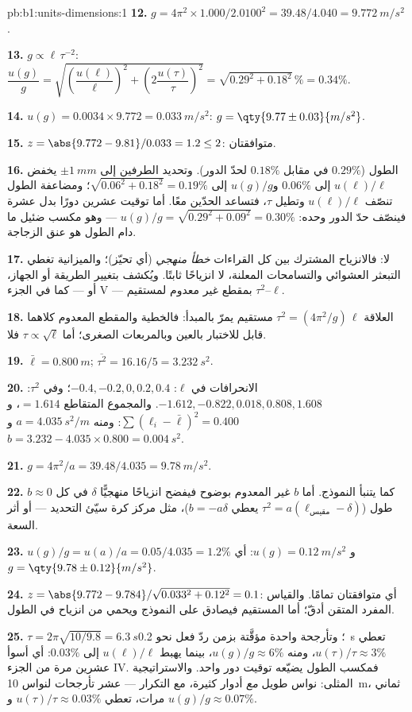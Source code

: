 \begin{solution}{pb:b1:units-dimensions:1}
\textbf{12.} $g = 4\pi^2 \times 1.000/2.0100^2 = 39.48/4.040 =
\qty{9.772}{m/s^2}$.

\textbf{13.} $g \propto \ell\,\tau^{-2}$:
$\dfrac{u(g)}{g} = \sqrt{\left(\dfrac{u(\ell)}{\ell}\right)^2
+ \left(2\dfrac{u(\tau)}{\tau}\right)^2} = \sqrt{0.29^2 + 0.18^2}\,\%
= 0.34\%$.

\textbf{14.} $u(g) = 0.0034 \times 9.772 = \qty{0.033}{m/s^2}$:
$g = \qty{9.77\pm0.03}{m/s^2}$.

\textbf{15.} $z = \abs{9.772 - 9.81}/0.033 = 1.2 \leq 2$: متوافقتان.

\textbf{16.} الطول ($0.29\%$ في مقابل $0.18\%$ لحدّ الدور).
وتحديد الطرفين إلى $\pm\qty{1}{mm}$ يخفض $u(\ell)/\ell$ إلى
$0.06\%$ و$u(g)/g$ إلى $\sqrt{0.06^2 + 0.18^2} = 0.19\%$؛ ومضاعفة
الطول تنصّف $u(\ell)/\ell$ وتطيل $\tau$، فتساعد الحدّين معًا. أما
توقيت عشرين دورًا بدل عشرة فينصّف حدّ الدور
وحده: $u(g)/g = \sqrt{0.29^2 + 0.09^2} = 0.30\%$ --- وهو مكسب ضئيل ما
دام الطول هو عنق الزجاجة.

\textbf{17.} لا: فالانزياح المشترك بين كل القراءات
\emph{خطأ منهجي} (أي تحيّز)؛ والميزانية تغطي التبعثر العشوائي
والتسامحات المعلنة، لا انزياحًا ثابتًا. ويُكشف بتغيير الطريقة أو
الجهاز، أو --- كما في الجزء V --- بمقطع غير معدوم لمستقيم
$\tau^2$--$\ell$.

\textbf{18.} العلاقة $\tau^2 = (4\pi^2/g)\,\ell$ مستقيم يمرّ بالمبدأ:
فالخطية والمقطع المعدوم كلاهما قابل للاختبار بالعين وبالمربعات
الصغرى؛ أما $\tau \propto \sqrt\ell$ فلا.

\textbf{19.} $\bar\ell = \qty{0.800}{m}$; $\overline{\tau^2} = 16.16/5 =
\qty{3.232}{s^2}$.

\textbf{20.} الانحرافات في $\ell$: $-0.4, -0.2, 0, 0.2, 0.4$؛ وفي
$\tau^2$: $-1.612, -0.822, 0.018, 0.808, 1.608$. والمجموع المتقاطع $= 1.614$،
و$\sum(\ell_i - \bar\ell)^2 = 0.400$: ومنه $a = \qty{4.035}{s^2/m}$ و
$b = 3.232 - 4.035 \times 0.800 = \qty{0.004}{s^2}$.

\textbf{21.} $g = 4\pi^2/a = 39.48/4.035 = \qty{9.78}{m/s^2}$.

\textbf{22.} $b \approx 0$ كما يتنبأ النموذج. أما $b$ غير المعدوم
بوضوح فيفضح انزياحًا منهجيًّا $\delta$ في كل طول
($\tau^2 = a(\ell_{\text{مقيس}} - \delta)$ يعطي $b = -a\delta$)، مثل
مركز كرة سيّئ التحديد --- أو أثر السعة.

\textbf{23.} $u(g)/g = u(a)/a = 0.05/4.035 = 1.2\%$ و $u(g) =
\qty{0.12}{m/s^2}$: أي $g = \qty{9.78\pm0.12}{m/s^2}$.

\textbf{24.} $z = \abs{9.772 - 9.784}/\sqrt{0.033^2 + 0.12^2} = 0.1$:
أي متوافقتان تمامًا. والقياس المفرد المتقن أدقّ؛ أما المستقيم فيصادق
على النموذج ويحمي من انزياح في الطول.

\textbf{25.} $\tau = 2\pi\sqrt{10/9.8} = \qty{6.3}{s}$؛ وتأرجحة واحدة
مؤقَّتة بزمن ردّ فعل نحو \qty{0.2}{s} تعطي $u(\tau)/\tau \approx
3\%$، ومنه $u(g)/g \approx 6\%$، بينما يهبط $u(\ell)/\ell$ إلى
$0.03\%$: أي أسوأ عشرين مرة من الجزء IV. فمكسب الطول يضيّعه توقيت دور
واحد. والاستراتيجية المثلى: نواس طويل \emph{مع} أدوار كثيرة، مع
التكرار --- عشر تأرجحات لنواس \qty{10}{m}، ثماني
مرات، تعطي $u(\tau)/\tau \approx 0.03\%$ و $u(g)/g \approx 0.07\%$.
\end{solution}
